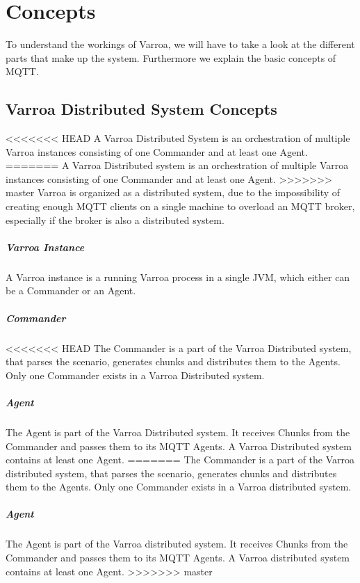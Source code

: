 \chapter{Concepts}
To understand the workings of Varroa, we will have to take a look at the different parts that make up the system.
Furthermore we explain the basic concepts of MQTT.

\section{Varroa Distributed System Concepts}
<<<<<<< HEAD
A Varroa Distributed System is an orchestration of multiple Varroa instances consisting of one Commander and at least one Agent.
=======
A Varroa Distributed system is an orchestration of multiple Varroa instances consisting of one Commander and at least one Agent.
>>>>>>> master
Varroa is organized as a distributed system, due to the impossibility of creating enough MQTT clients on a single machine to overload an MQTT broker, especially if the broker is also a distributed system.

\paragraph{Varroa Instance}
A Varroa instance is a running Varroa process in a single JVM, which either can be a Commander or an Agent.

\paragraph{Commander}
<<<<<<< HEAD
The Commander is a part of the Varroa Distributed system, that parses the scenario, generates chunks and distributes them to the Agents.
Only one Commander exists in a Varroa Distributed system.

\paragraph{Agent}
The Agent is part of the Varroa Distributed system.
It receives Chunks from the Commander and passes them to its MQTT Agents.
A Varroa Distributed system contains at least one Agent.
=======
The Commander is a part of the Varroa distributed system, that parses the scenario, generates chunks and distributes them to the Agents.
Only one Commander exists in a Varroa distributed system.

\paragraph{Agent}
The Agent is part of the Varroa distributed system.
It receives Chunks from the Commander and passes them to its MQTT Agents.
A Varroa distributed system contains at least one Agent.
>>>>>>> master

